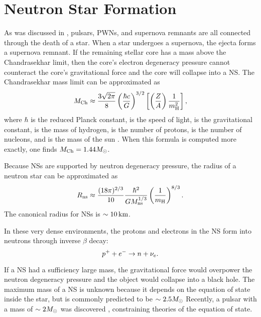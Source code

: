 \section{Neutron Star Formation}

As was discussed in , pulsars, \acp{PWN},
and supernova remnants are all connected through the death of a star.
When a star undergoes a supernova, the ejecta forms a supernova remnant.
If the remaining stellar core has a mass above the Chandrasekhar
limit, then the core's electron degeneracy pressure cannot counteract
the core's gravitational force and the core will collapse into
a \ac{NS}.  The Chandrasekhar mass limit can be approximated as
\citep{chandrasekhar_1931_maximum-ideal}
\begin{equation}
  M_\text{Ch} \approx 
  \frac{3\sqrt{2\pi}}{8}
  \left(\frac{\hbar c}{G}\right)^{3/2}
  \left[
  \left(\frac{Z}{A}\right)
  \frac{1}{m_\text{H}^2}
  \right],
\end{equation}
where $\hbar$ is the reduced Planck constant, \speedoflight is the
speed of light, \gravitationalconstant is the gravitational constant,
\MassHydrogen is the mass of hydrogen, \NumberProtons is the number of
protons, \NumberNucleons is the number of nucleons, and \solarmass is the
mass of the sun \citep{carroll_2006_introduction-modern}.  When this
formula is computed more exactly, one finds $M_\text{Ch} =
1.44 M_{\odot}$.

Because \acp{NS} are supported by
neutron degeneracy pressure,
the radius of a neutron star can be approximated as
\citep{carroll_2006_introduction-modern}
\begin{equation}
  R_\text{ns} \approx \frac{(18 \pi)^{2/3}}{10}
  \frac{\hbar^2}{G M_\text{ns}^{1/3}}
  \left(\frac{1}{m_\text{H}}\right)^{8/3}.
\end{equation}
The canonical radius for \acp{NS} is $\sim 10\,\text{km}$.

In these very dense environments, the protons and electrons in the \ac{NS}
form into neutrons through inverse $\beta$ decay:
\begin{equation}
  p^+ + e^- 
  \rightarrow n + \nu_e.
\end{equation}

If a \ac{NS} had a sufficiency large mass, the gravitational
force would overpower the neutron degeneracy pressure and the
object would collapse into a black hole. The maximum mass of a
\ac{NS} is unknown because it depends on the equation of state
inside the star, but is commonly predicted to be $\sim 2.5M_{\odot}$
Recently, a pulsar with a mass of $\sim 2M_{\odot}$ was discovered
\citep{demorest_2010_two-solar-mass-neutron}, constraining
theories of the equation of state.

